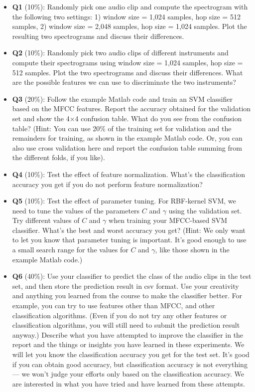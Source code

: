 \documentclass[twoside,a4paper]{refart}
\begin{document}
\begin{itemize}
\item \textbf{Q1} (10\%): Randomly pick one audio clip and compute the spectrogram with the following two settings: 1) window size = 1,024 samples, hop size = 512 samples, 2) window size = 2,048 samples, hop size = 1,024 samples. Plot the resulting two spectrograms and discuss their differences.
\item \textbf{Q2} (10\%): Randomly pick two audio clips of different instruments and compute their spectrograms using window size = 1,024 samples, hop size = 512 samples. Plot the two spectrograms and discuss their differences. What are the possible features we can use to discriminate the two instruments?
\item \textbf{Q3} (20\%): Follow the example Matlab code and train an SVM classifier based on the MFCC features. Report the accuracy obtained for the validation set and show the 4$\times$4 confusion table. What do you see from the confusion table? (Hint: You can use 20\% of the training set for validation and the remainders for training, as shown in the example Matlab code. Or, you can also use cross validation here and report the confusion table summing from the different folds, if you like).
\item \textbf{Q4} (10\%): Test the effect of feature normalization. What's the classification accuracy you get if you do not perform feature normalization?
\item \textbf{Q5} (10\%): Test the effect of parameter tuning. For RBF-kernel SVM, we need to tune the values of the parameters $C$ and $\gamma$ using the validation set. Try different values of $C$ and $\gamma$ when training your MFCC-based SVM classifier. What's the best and worst accuracy you get? (Hint: We only want to let you know that parameter tuning is important. It's good enough to use a small search range for the values for $C$ and $\gamma$, like those shown in the example Matlab code.)
\item \textbf{Q6} (40\%): Use your classifier to predict the class of the audio clips in the test set, and then store the prediction result in csv format. Use your creativity and anything you learned from the course to make the classifier better. For example, you can try to use features other than MFCC, and other classification algorithms. (Even if you do not try any other features or classification algorithms, you will still need to submit the prediction result anyway.) Describe what you have attempted to improve the classifier in the report and the things or insights you have learned in these experiments. We will let you know the classification accuracy you get for the test set. It's good if you can obtain good accuracy, but classification accuracy is not everything --- we won't judge your efforts only based on the classification accuracy. We are interested in what you have tried and have learned from these attempts.
\end{itemize}
\end{document}

